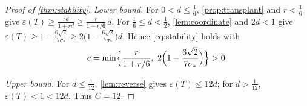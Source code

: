 \documentclass[11pt,reqno]{amsart}
\numberwithin{equation}{section}
\theoremstyle{remark}
\begin{document}
\begin{proof}[Proof of \cref{thm:stability}]
\emph{Lower bound.} For $0<d\le\frac16$, \cref{prop:transplant} and
$r<\frac16$ give
$\varepsilon(T)\ge\frac{rd}{1+rd}\ge\frac{r}{1+r/6}\,d$. For
$\frac16\le d<\frac12$, \cref{lem:coordinate} and $2d<1$ give
$\varepsilon(T)\ge1-\frac{6\sqrt2}{7\sigma_*}
\ge2\bigl(1-\frac{6\sqrt2}{7\sigma_*}\bigr)d$. Hence \eqref{eq:stability}
holds with
\begin{equation}\label{eq:stability-constant}
 c=\min\Bigl\{\frac{r}{1+r/6},\ 2\Bigl(1-\frac{6\sqrt2}{7\sigma_*}\Bigr)\Bigr\}>0 .
\end{equation}

\emph{Upper bound.} For $d\le\frac1{12}$, \cref{lem:reverse} gives
$\varepsilon(T)\le12d$; for $d>\frac1{12}$, $\varepsilon(T)<1<12d$. Thus
$C=12$.
\end{proof}
\end{document}
